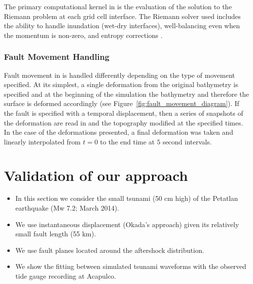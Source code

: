 \documentclass[preprint,review,12pt]{elsarticle}
\begin{document}
The primary computational kernel in \geoclaw is the evaluation of the solution to the Riemann problem at each grid cell interface.  The Riemann solver used includes the ability to handle inundation (wet-dry interfaces), well-balancing even when the momentum is non-zero, and entropy corrections \cite{George:2008aa}.

\subsubsection{Fault Movement Handling}

Fault movement in \geoclaw is handled differently depending on the type of movement specified.  At its simplest, a single deformation from the original bathymetry is specified and at the beginning of the simulation the bathymetry and therefore the surface is deformed accordingly (see Figure~\ref{fig:fault_movement_diagram}).  If the fault is specified with a temporal displacement, then a series of snapshots of the deformation are read in and the topography modified at the specified times.  In the case of the deformations presented, a final deformation was taken and linearly interpolated from $t=0$ to the end time at $5$ second intervals.


\section{Validation of our approach}
\begin{itemize}
  \item In this section we consider the small tsunami (50 cm high) of the Petatlan earthquake (Mw 7.2; March 2014). 
  \item We use instantaneous displacement (Okada's approach) given its relatively small fault length (55 km).
  \item We use fault planes located around the aftershock distribution.
  \item We show the fitting between simulated tsunami waveforms with the observed tide gauge recording at Acapulco.
\end{itemize}
\end{document}
